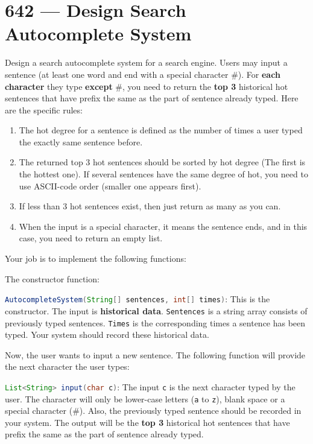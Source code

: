 \section{642 --- Design Search Autocomplete System}
Design a search autocomplete system for a search engine. Users may input a sentence (at least one word and end with a special character \#). For \textbf{each character} they type \textbf{except} \#, you need to return the \textbf{top 3} historical hot sentences that have prefix the same as the part of sentence already typed. Here are the specific rules:

\begin{enumerate}
\item The hot degree for a sentence is defined as the number of times a user typed the exactly same sentence before.
\item The returned top 3 hot sentences should be sorted by hot degree (The first is the hottest one). If several sentences have the same degree of hot, you need to use ASCII-code order (smaller one appears first).
\item If less than 3 hot sentences exist, then just return as many as you can.
\item When the input is a special character, it means the sentence ends, and in this case, you need to return an empty list.
\end{enumerate}

Your job is to implement the following functions:

The constructor function:

\lstinline[language=Java, basicstyle=\small\ttfamily, keywordstyle=\bfseries\color{green!40!black}]|AutocompleteSystem(String[] sentences, int[] times)|: This is the constructor. The input is \textbf{historical data}. \texttt{Sentences} is a string array consists of previously typed sentences. \texttt{Times} is the corresponding times a sentence has been typed. Your system should record these historical data.

Now, the user wants to input a new sentence. The following function will provide the next character the user types:

\lstinline[language=Java, basicstyle=\small\ttfamily, keywordstyle=\bfseries\color{green!40!black}]|List<String> input(char c)|: The input \texttt{c} is the next character typed by the user. The character will only be lower-case letters (\texttt{a} to \texttt{z}), blank space or a special character (\#). Also, the previously typed sentence should be recorded in your system. The output will be the \textbf{top 3} historical hot sentences that have prefix the same as the part of sentence already typed.
 


